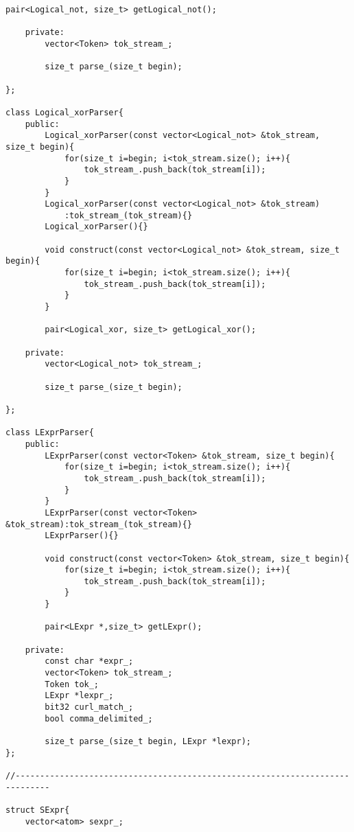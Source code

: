 \documentclass[pdftex,12pt,letterpaper,notitlepage,twoside]{article}
\begin{document}
\begin{lstlisting}[frame=single,caption={C program for testing}]
        pair<Logical_not, size_t> getLogical_not();

    private:
        vector<Token> tok_stream_;
        
        size_t parse_(size_t begin);

};

class Logical_xorParser{
    public:
        Logical_xorParser(const vector<Logical_not> &tok_stream, size_t begin){
            for(size_t i=begin; i<tok_stream.size(); i++){
                tok_stream_.push_back(tok_stream[i]);
            }
        }
        Logical_xorParser(const vector<Logical_not> &tok_stream)
            :tok_stream_(tok_stream){}
        Logical_xorParser(){}

        void construct(const vector<Logical_not> &tok_stream, size_t begin){
            for(size_t i=begin; i<tok_stream.size(); i++){
                tok_stream_.push_back(tok_stream[i]);
            }
        }

        pair<Logical_xor, size_t> getLogical_xor();

    private:
        vector<Logical_not> tok_stream_;
        
        size_t parse_(size_t begin);

};

class LExprParser{
    public:
        LExprParser(const vector<Token> &tok_stream, size_t begin){
            for(size_t i=begin; i<tok_stream.size(); i++){
                tok_stream_.push_back(tok_stream[i]);
            }
        }
        LExprParser(const vector<Token> &tok_stream):tok_stream_(tok_stream){}
        LExprParser(){}

        void construct(const vector<Token> &tok_stream, size_t begin){
            for(size_t i=begin; i<tok_stream.size(); i++){
                tok_stream_.push_back(tok_stream[i]);
            }
        }

        pair<LExpr *,size_t> getLExpr();
        
    private:
        const char *expr_;
        vector<Token> tok_stream_;
        Token tok_;
        LExpr *lexpr_;
        bit32 curl_match_;
        bool comma_delimited_;

        size_t parse_(size_t begin, LExpr *lexpr);
};

//-----------------------------------------------------------------------------

struct SExpr{
    vector<atom> sexpr_;


\end{lstlisting}
\end{document}
